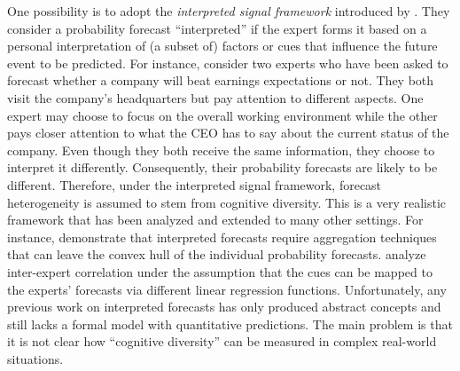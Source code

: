 \documentclass[11pt]{article}
\theoremstyle{definition}
\theoremstyle{definition}
\begin{document}
One possibility is to adopt the \textit{interpreted signal framework} introduced by \citet{hong2009interpreted}. They consider a probability forecast ``interpreted'' if the expert forms it based on a personal interpretation of (a subset of) factors or cues that influence the future event to be predicted.  For instance, consider two experts who have been asked to forecast whether a company will beat earnings expectations or not. They both visit the company's headquarters but pay attention to different aspects. One expert may choose to focus on the overall working environment while the other pays closer attention to what the CEO has to say about the current status of the company.  
 Even though they both receive the same information, they choose to interpret it differently. Consequently, their probability forecasts are likely to be different. Therefore, under the interpreted signal framework, forecast heterogeneity is assumed to stem from cognitive diversity. This is a very realistic framework that has been analyzed and extended to many other settings. For instance, \citet{parunak2013characterizing} demonstrate that interpreted forecasts require aggregation techniques that can leave the convex hull of the individual probability forecasts. \citet{broomell2009experts} analyze inter-expert correlation under the assumption that the cues can be mapped to the experts' forecasts via different linear regression functions. Unfortunately, any previous work on interpreted forecasts has only produced abstract concepts and still lacks a formal model with quantitative predictions. The main problem is that it is not clear how ``cognitive diversity'' can be measured in complex real-world situations.
 
\end{document}
